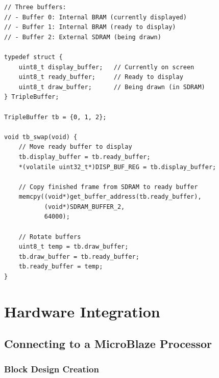 \documentclass[11pt,letterpaper]{report}
\begin{document}
\begin{lstlisting}[style=c,caption={Triple Buffering Concept}]
// Three buffers:
// - Buffer 0: Internal BRAM (currently displayed)
// - Buffer 1: Internal BRAM (ready to display)
// - Buffer 2: External SDRAM (being drawn)

typedef struct {
    uint8_t display_buffer;   // Currently on screen
    uint8_t ready_buffer;     // Ready to display
    uint8_t draw_buffer;      // Being drawn (in SDRAM)
} TripleBuffer;

TripleBuffer tb = {0, 1, 2};

void tb_swap(void) {
    // Move ready buffer to display
    tb.display_buffer = tb.ready_buffer;
    *(volatile uint32_t*)DISP_BUF_REG = tb.display_buffer;
    
    // Copy finished frame from SDRAM to ready buffer
    memcpy((void*)get_buffer_address(tb.ready_buffer),
           (void*)SDRAM_BUFFER_2,
           64000);
    
    // Rotate buffers
    uint8_t temp = tb.draw_buffer;
    tb.draw_buffer = tb.ready_buffer;
    tb.ready_buffer = temp;
}
\end{lstlisting}

\chapter{Hardware Integration}

\section{Connecting to a MicroBlaze Processor}

\subsection{Block Design Creation}
\end{document}
